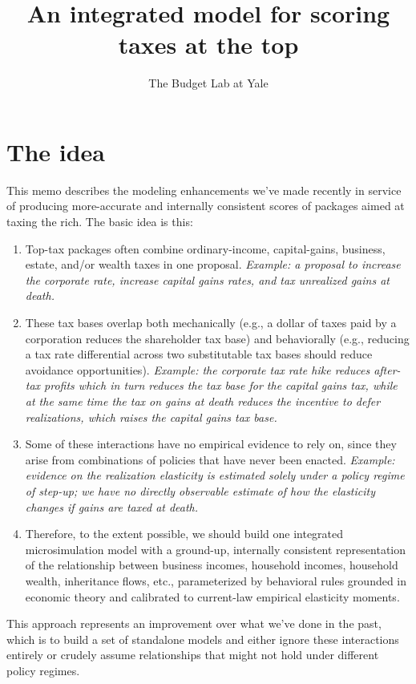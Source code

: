 \documentclass[10pt,twocolumn]{article}
\title{\color{yaleblue}\textbf{An integrated model for scoring taxes at the top}}
\author{\normalsize The Budget Lab at Yale}
\date{}
\begin{document}
\maketitle

\section{The idea}

This memo describes the modeling enhancements we've made recently in service
of producing more-accurate and internally consistent scores of packages aimed
at taxing the rich. The basic idea is this:
\begin{enumerate}[leftmargin=1.4em,itemsep=0.25em]
\item Top-tax packages often combine ordinary-income, capital-gains, business,
estate, and/or wealth taxes in one proposal. \emph{Example: a proposal to
increase the corporate rate, increase capital gains rates, and tax unrealized
gains at death.}
\item These tax bases overlap both mechanically (e.g., a dollar of taxes paid
by a corporation reduces the shareholder tax base) and behaviorally (e.g.,
reducing a tax rate differential across two substitutable tax bases should
reduce avoidance opportunities). \emph{Example: the corporate tax rate hike
reduces after-tax profits which in turn reduces the tax base for the capital
gains tax, while at the same time the tax on gains at death reduces the
incentive to defer realizations, which raises the capital gains tax base.}
\item Some of these interactions have no empirical evidence to rely on, since
they arise from combinations of policies that have never been enacted.
\emph{Example: evidence on the realization elasticity is estimated solely
under a policy regime of step-up; we have no directly observable estimate of
how the elasticity changes if gains are taxed at death.}
\item Therefore, to the extent possible, we should build one integrated
microsimulation model with a ground-up, internally consistent representation
of the relationship between business incomes, household incomes, household
wealth, inheritance flows, etc., parameterized by behavioral rules grounded in
economic theory and calibrated to current-law empirical elasticity moments.
\end{enumerate}

This approach represents an improvement over what we've done in the past,
which is to build a set of standalone models and either ignore these
interactions entirely or crudely assume relationships that might not hold
under different policy regimes.
\end{document}
